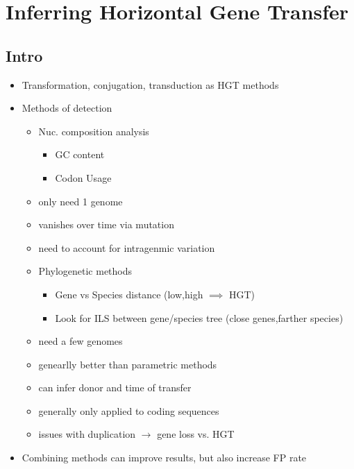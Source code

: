 \documentclass[10pt,letter]{article}
\begin{document}
\section*{Inferring Horizontal Gene Transfer \cite{ihgt}}
\subsection*{Intro}
\begin{itemize}
    \item Transformation, conjugation, transduction as HGT methods
    \item Methods of detection
    \begin{itemize}
        \item Nuc. composition analysis
        \begin{itemize}
            \item GC content
            \item Codon Usage
        \end{itemize}
        \item only need 1 genome
        \item vanishes over time via mutation
        \item need to account for intragenmic variation
        \item Phylogenetic methods
        \begin{itemize}
            \item Gene vs Species distance (low,high $\implies$ HGT)
            \item Look for ILS between gene/species tree (close genes,farther species)
        \end{itemize}
        \item need a few genomes
        \item genearlly better than parametric methods
        \item can infer donor and time of transfer
        \item generally only applied to coding sequences
        \item issues with duplication $\to$ gene loss vs. HGT
    \end{itemize}
    \item Combining methods can improve results, but also increase FP rate
\end{itemize}
\end{document}
